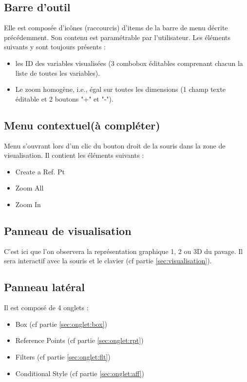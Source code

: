 \documentclass[a4paper]{article}
\begin{document}
\subsection{Barre d'outil} 
Elle est composée d'icônes (raccourcis) d'items de la barre de menu décrite précédemment. Son contenu est paramétrable par l'utilisateur. Les éléments suivants y sont toujours présents :
\begin{itemize}
\item les ID des variables visualisées (3 combobox éditables comprenant chacun la liste de toutes les variables).\danger
\item Le zoom homogène, i.e., égal sur toutes les dimensions (1 champ texte éditable et 2 boutons "+" et "-").\danger
\end{itemize}

\subsection{Menu contextuel(à compléter)}
Menu s'ouvrant lors d'un clic du bouton droit de la souris dans la zone de visualisation. Il contient les éléments suivants :
\begin{itemize}
\item Create a Ref. Pt
\item Zoom All
\item Zoom In
\end{itemize}

\subsection{Panneau de visualisation}
C'est ici que l'on observera la représentation graphique 1, 2 ou 3D du pavage. Il sera interactif avec la souris et le clavier (cf partie \ref{sec:visualisation}).

\subsection{Panneau latéral}
Il est composé de 4 onglets :
\begin{itemize}
\item Box (cf partie \ref{sec:onglet:box})
\item Reference Points (cf partie \ref{sec:onglet:rpt})
\item Filters (cf partie \ref{sec:onglet:flt})
\item Conditional Style (cf partie \ref{sec:onglet:aff})
\end{itemize}
\end{document}
